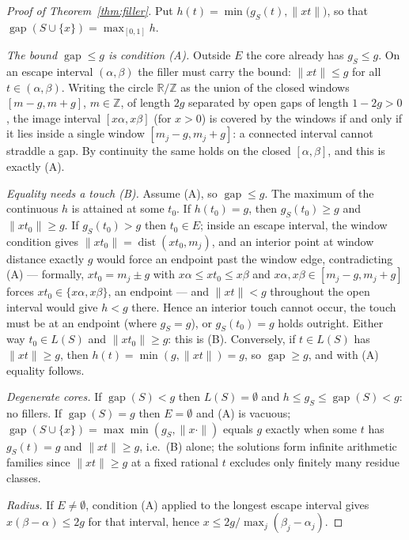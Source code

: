 \documentclass[11pt,a4paper]{article}
\theoremstyle{plain}
\theoremstyle{definition}
\theoremstyle{remark}
\newcommand{\norm}[1]{\lVert #1 \rVert}
\newcommand{\gap}{\operatorname{gap}}
\newcommand{\R}{\mathbb{R}}
\newcommand{\Z}{\mathbb{Z}}
\begin{document}
\begin{proof}[Proof of Theorem~\ref{thm:filler}]
Put $h(t) = \min\bigl(g_S(t), \norm{xt}\bigr)$, so that $\gap(S \cup \{x\})
= \max_{[0,1]} h$.

\emph{The bound $\gap \le g$ is condition (A).} Outside $E$ the core already
has $g_S \le g$. On an escape interval $(\alpha, \beta)$ the filler must
carry the bound: $\norm{xt} \le g$ for all $t \in (\alpha, \beta)$. Writing
the circle $\R/\Z$ as the union of the closed windows $[m - g, m + g]$,
$m \in \Z$, of length $2g$ separated by open gaps of length $1 - 2g > 0$,
the image interval $[x\alpha, x\beta]$ (for $x > 0$) is covered by the
windows if and only if it lies inside a single window $[m_j - g, m_j + g]$:
a connected interval cannot straddle a gap. By continuity the same holds on
the closed $[\alpha, \beta]$, and this is exactly (A).

\emph{Equality needs a touch (B).} Assume (A), so $\gap \le g$. The maximum
of the continuous $h$ is attained at some $t_0$. If $h(t_0) = g$, then
$g_S(t_0) \ge g$ and $\norm{xt_0} \ge g$. If $g_S(t_0) > g$ then $t_0 \in
E$; inside an escape interval, the window condition gives $\norm{xt_0} =
\operatorname{dist}(x t_0, m_j)$, and an interior point at window distance
exactly $g$ would force an endpoint past the window edge, contradicting
(A) --- formally, $x t_0 = m_j \pm g$ with $x\alpha \le x t_0 \le x\beta$
and $x\alpha, x\beta \in [m_j - g, m_j + g]$ forces $x t_0 \in
\{x\alpha, x\beta\}$, an endpoint --- and $\norm{xt} < g$ throughout the
open interval would give $h < g$ there. Hence an interior touch cannot
occur, the touch must be at an endpoint (where $g_S = g$), or
$g_S(t_0) = g$ holds outright. Either way $t_0 \in L(S)$ and
$\norm{xt_0} \ge g$: this is (B). Conversely, if $t \in L(S)$ has
$\norm{xt} \ge g$, then $h(t) = \min(g, \norm{xt}) = g$, so $\gap \ge g$,
and with (A) equality follows.

\emph{Degenerate cores.} If $\gap(S) < g$ then $L(S) = \emptyset$ and $h \le
g_S \le \gap(S) < g$: no fillers. If $\gap(S) = g$ then $E = \emptyset$
and (A) is vacuous; $\gap(S \cup \{x\}) = \max \min(g_S, \norm{x \cdot})$
equals $g$ exactly when some $t$ has $g_S(t) = g$ and $\norm{xt} \ge g$,
i.e.\ (B) alone; the solutions form infinite arithmetic families since
$\norm{xt} \ge g$ at a fixed rational $t$ excludes only finitely many
residue classes.

\emph{Radius.} If $E \ne \emptyset$, condition (A) applied to the longest
escape interval gives $x (\beta - \alpha) \le 2g$ for that interval, hence
$x \le 2g / \max_j (\beta_j - \alpha_j)$.
\end{proof}
\end{document}
